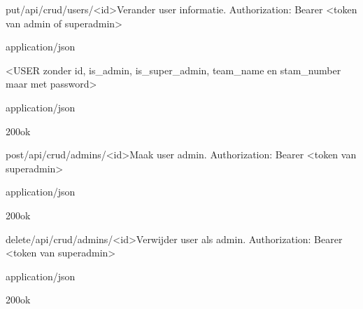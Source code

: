 \documentclass[10pt]{article}
\begin{document}
\begin{apiRoute}{put}{/api/crud/users/<id>}{Verander user informatie.}
 Authorization: Bearer <token van admin of superadmin>
	\begin{routeParameter}
	\end{routeParameter}

	\begin{routeRequest}{application/json}
		\begin{routeRequestBody}
<USER zonder id, is_admin, is_super_admin, team_name en stam_number maar met password>
		\end{routeRequestBody}
	\end{routeRequest}

	\begin{routeResponse}{application/json}
		\begin{routeResponseItem}{200}{ok}
			\begin{routeResponseItemBody}
			\end{routeResponseItemBody}
		\end{routeResponseItem}
	\end{routeResponse}
\end{apiRoute}

\begin{apiRoute}{post}{/api/crud/admins/<id>}{Maak user admin.}
 Authorization: Bearer <token van superadmin>
	\begin{routeParameter}
		\routeParamItem{id}{user id}
	\end{routeParameter}

	\begin{routeResponse}{application/json}
		\begin{routeResponseItem}{200}{ok}
			\begin{routeResponseItemBody}
			\end{routeResponseItemBody}
		\end{routeResponseItem}
	\end{routeResponse}
\end{apiRoute}

\begin{apiRoute}{delete}{/api/crud/admins/<id>}{Verwijder user als admin.}
 Authorization: Bearer <token van superadmin>
	\begin{routeParameter}
		\routeParamItem{id}{admin id}
	\end{routeParameter}

	\begin{routeResponse}{application/json}
		\begin{routeResponseItem}{200}{ok}
			\begin{routeResponseItemBody}
			\end{routeResponseItemBody}
		\end{routeResponseItem}
	\end{routeResponse}
\end{apiRoute}
\end{document}

